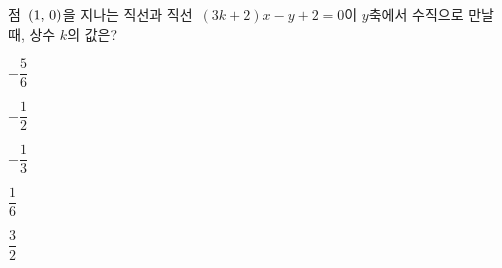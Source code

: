 점~$(1,\mkern3mu 0)$을 지나는 직선과 직선~$(3k+2)x-y+2=0$이 $y$축에서 수직으로 만날 때, 상수 $k$의 값은?
\begin{choices32}{\rule[-3ex]{0pt}{8ex}$-\dfrac{5}{6}$}{\rule[-3ex]{0pt}{8ex}$-\dfrac{1}{2}$}{\rule[-3ex]{0pt}{8ex}$-\dfrac{1}{3}$}{\rule[-3ex]{0pt}{8ex}$\dfrac{1}{6}$}{\rule[-3ex]{0pt}{8ex}$\dfrac{3}{2}$}\end{choices32}
